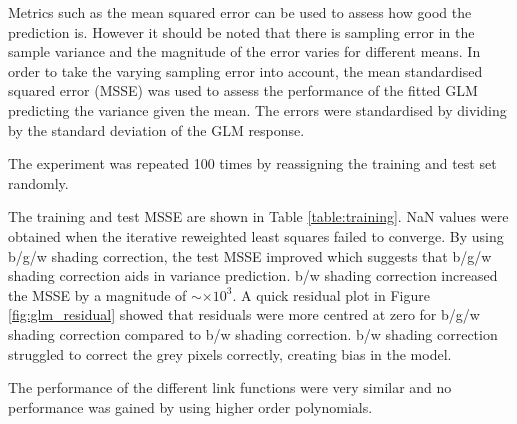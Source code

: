 \documentclass[a4paper]{proc}
\begin{document}
Metrics such as the mean squared error can be used to assess how good the prediction is. However it should be noted that there is sampling error in the sample variance and the magnitude of the error varies for different means. In order to take the varying sampling error into account, the mean standardised squared error (MSSE) was used to assess the performance of the fitted GLM predicting the variance given the mean. The errors were standardised by dividing by the standard deviation of the GLM response.

The experiment was repeated 100 times by reassigning the training and test set randomly.

The training and test MSSE are shown in Table \ref{table:training}. NaN values were obtained when the iterative reweighted least squares failed to converge. By using b/g/w shading correction, the test MSSE improved which suggests that b/g/w shading correction aids in variance prediction. b/w shading correction increased the MSSE by a magnitude of $\sim\times10^3$. A quick residual plot in Figure \ref{fig:glm_residual} showed that residuals were more centred at zero for b/g/w shading correction compared to b/w shading correction. b/w shading correction struggled to correct the grey pixels correctly, creating bias in the model.

The performance of the different link functions were very similar and no performance was gained by using higher order polynomials.

\end{document}
